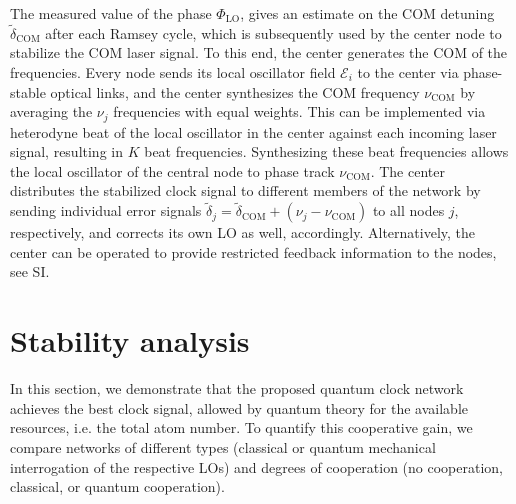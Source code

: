 The measured value of the phase  $\Phi_\mathrm{LO}$,
gives an estimate on the COM detuning
$\tilde\delta_\mathrm{COM}$ after each Ramsey cycle, which is subsequently used
by the center node to stabilize the COM laser signal.
To this end, the center generates the COM of the frequencies. Every node sends
its local oscillator field $\mathcal{E}_i$ to the center via phase-stable
optical links, and the center synthesizes the COM frequency $\nu_\mathrm{COM}$ by
averaging the $\nu_j$ frequencies with equal weights.
This can be implemented via heterodyne beat of the local oscillator in the
center against each incoming laser signal, resulting in $K$ beat frequencies.
Synthesizing  these beat frequencies allows the
local oscillator of the central node to phase track $\nu_\mathrm{COM}$.
The center distributes the stabilized clock signal to different members of the network by sending individual error
signals $\tilde \delta_j = \tilde \delta_\mathrm{COM} + (\nu_j - \nu_\mathrm{COM})$
to all nodes $j$, respectively, and corrects its own LO as well, accordingly.
Alternatively, the center can be operated to provide restricted feedback
information to the nodes, see SI.



\section{Stability analysis}
\label{sec:comp}

In this section, we demonstrate that the proposed quantum clock network achieves
the best clock signal, allowed by quantum theory for the available resources, i.e.
the total atom number. 
To quantify this cooperative gain, we compare
networks of different types (classical or quantum mechanical interrogation of
the respective LOs) and degrees of cooperation (no cooperation, classical, or
quantum cooperation).


